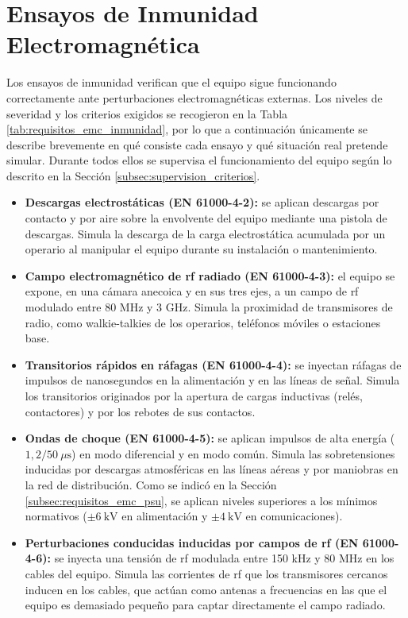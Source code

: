 \section{Ensayos de Inmunidad Electromagnética}
\label{sec:ensayos_inmunidad}

Los ensayos de inmunidad verifican que el equipo sigue funcionando correctamente ante perturbaciones electromagnéticas externas. Los niveles de severidad y los criterios exigidos se recogieron en la Tabla \ref{tab:requisitos_emc_inmunidad}, por lo que a continuación únicamente se describe brevemente en qué consiste cada ensayo y qué situación real pretende simular. Durante todos ellos se supervisa el funcionamiento del equipo según lo descrito en la Sección \ref{subsec:supervision_criterios}.

\begin{itemize}
    \item \textbf{Descargas electrostáticas (EN 61000-4-2):} se aplican descargas por contacto y por aire sobre la envolvente del equipo mediante una pistola de descargas. Simula la descarga de la carga electrostática acumulada por un operario al manipular el equipo durante su instalación o mantenimiento.
    \item \textbf{Campo electromagnético de \gls{rf} radiado (EN 61000-4-3):} el equipo se expone, en una cámara anecoica y en sus tres ejes, a un campo de \gls{rf} modulado entre 80 MHz y 3 GHz. Simula la proximidad de transmisores de radio, como walkie-talkies de los operarios, teléfonos móviles o estaciones base.
    \item \textbf{Transitorios rápidos en ráfagas (EN 61000-4-4):} se inyectan ráfagas de impulsos de nanosegundos en la alimentación y en las líneas de señal. Simula los transitorios originados por la apertura de cargas inductivas (relés, contactores) y por los rebotes de sus contactos.
    \item \textbf{Ondas de choque (EN 61000-4-5):} se aplican impulsos de alta energía ($1,2/50\ \mu\text{s}$) en modo diferencial y en modo común. Simula las sobretensiones inducidas por descargas atmosféricas en las líneas aéreas y por maniobras en la red de distribución. Como se indicó en la Sección \ref{subsec:requisitos_emc_psu}, se aplican niveles superiores a los mínimos normativos ($\pm 6\ \text{kV}$ en alimentación y $\pm 4\ \text{kV}$ en comunicaciones).
    \item \textbf{Perturbaciones conducidas inducidas por campos de \gls{rf} (EN 61000-4-6):} se inyecta una tensión de \gls{rf} modulada entre 150 kHz y 80 MHz en los cables del equipo. Simula las corrientes de \gls{rf} que los transmisores cercanos inducen en los cables, que actúan como antenas a frecuencias en las que el equipo es demasiado pequeño para captar directamente el campo radiado.

\end{itemize}
